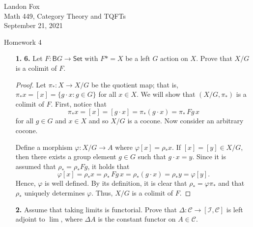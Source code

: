 \documentclass[ 12pt ]{article}
\begin{document}
\noindent Landon Fox \\
\noindent Math 449, Category Theory and TQFTs \\
\noindent September 21, 2021

\begin{center}
\Large Homework 4
\end{center}

\begin{enumerate}

	\item[\textbf{1.}] \textbf{6.} Let $F : \mathsf{B}G \to \mathsf{Set}$ with $F \ast = X$ be a left $G$ action on $X$. Prove that $X/G$ is a colimit of $F$.

		\begin{proof}
			Let $\pi_\ast : X \to X/G$ be the quotient map; that is, $\pi_\ast x = [x] = \{ g \cdot x : g \in G \}$ for all $x \in X$. We will show that $(X/G, \pi_\ast)$ is a colimit of $F$. First, notice that $$\pi_\ast x = [x] = [g \cdot x] = \pi_\ast (g \cdot x) = \pi_\ast\, Fg\, x$$ for all $g \in G$ and $x \in X$ and so $X/G$ is a cocone. Now consider an arbitrary cocone.
			\begin{center}
			\end{center}
			Define a morphism $\varphi : X/G \to A$ where $\varphi[x] = \rho_\ast x$. If $[x] = [y] \in X/G$, then there exists a group element $g \in G$ such that $g \cdot x = y$. Since it is assumed that $\rho_\ast = \rho_\ast Fg$, it holds that $$\varphi[x] = \rho_\ast x = \rho_\ast\, Fg\, x = \rho_\ast (g \cdot x) = \rho_\ast y = \varphi [y].$$ Hence, $\varphi$ is well defined. By its definition, it is clear that $\rho_\ast = \varphi \pi_\ast$ and that $\rho_\ast$ uniquely determines $\varphi$. Thus, $X/G$ is a colimit of $F$.
		\end{proof}


	\item[\textbf{2.}] Assume that taking limits is functorial. Prove that $\Delta : \mathscr{C} \to [\mathscr{I}, \mathscr{C}]$ is left adjoint to $\lim$, where $\Delta A$ is the constant functor on $A \in \mathscr{C}$.


\end{enumerate}
\end{document}
